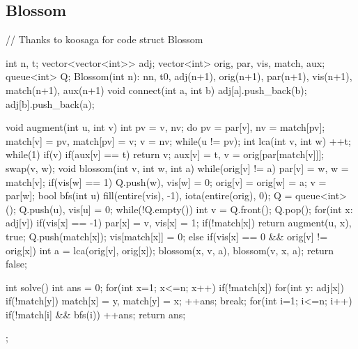 \subsection{Blossom}
\begin{cpp}
// Thanks to koosaga for code
struct Blossom{
  int n, t;
  vector<vector<int>> adj;
  vector<int> orig, par, vis, match, aux;
  queue<int> Q;
  Blossom(int n): n{n}, t{0}, adj(n+1), orig(n+1),
    par(n+1), vis(n+1), match(n+1), aux(n+1) {}
  void connect(int a, int b){
    adj[a].push_back(b);
    adj[b].push_back(a);
  }

  void augment(int u, int v){
    int pv = v, nv;
    do{
      pv = par[v], nv = match[pv];
      match[v] = pv, match[pv] = v;
      v = nv;
    } while(u != pv);
  }
  int lca(int v, int w){
    ++t;
    while(1){
      if(v){
        if(aux[v] == t) return v;
        aux[v] = t, v = orig[par[match[v]]];
      }
      swap(v, w);
    }
  }
  void blossom(int v, int w, int a){
    while(orig[v] != a){
      par[v] = w, w = match[v];
      if(vis[w] == 1) Q.push(w), vis[w] = 0;
      orig[v] = orig[w] = a;
      v = par[w];
    }
  }
  bool bfs(int u){
    fill(entire(vis), -1), iota(entire(orig), 0);
    Q = queue<int>(); Q.push(u), vis[u] = 0;
    while(!Q.empty()){
      int v = Q.front(); Q.pop();
      for(int x: adj[v]){
        if(vis[x] == -1){
          par[x] = v, vis[x] = 1;
          if(!match[x]) return augment(u, x), true;
          Q.push(match[x]); vis[match[x]] = 0;
        }
        else if(vis[x] == 0 && orig[v] != orig[x]){
          int a = lca(orig[v], orig[x]);
          blossom(x, v, a), blossom(v, x, a);
        }
      }
    }
    return false;
  }

  int solve(){
    int ans = 0;
    for(int x=1; x<=n; x++) if(!match[x]){
      for(int y: adj[x]) if(!match[y]){
        match[x] = y, match[y] = x;
        ++ans; break;
      }
    }
    for(int i=1; i<=n; i++) if(!match[i] && bfs(i)) ++ans;
    return ans;
  }
};
\end{cpp}